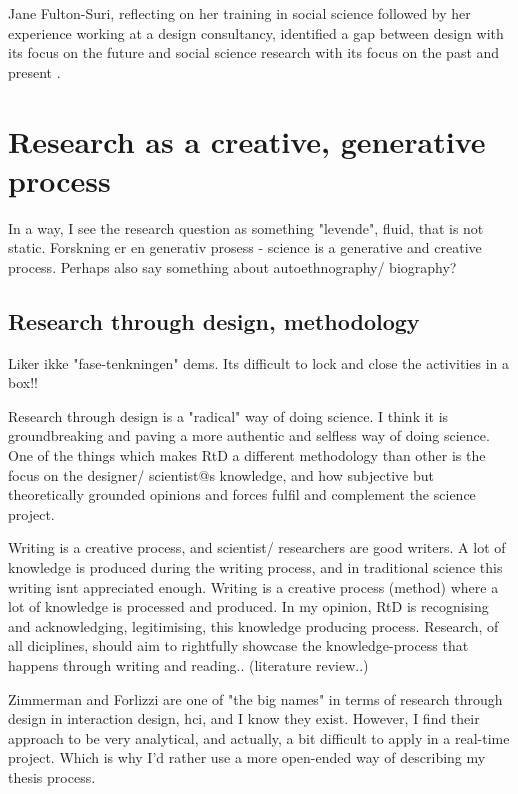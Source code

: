 Jane Fulton-Suri, reflecting on her training in social science followed by her experience working at a design consultancy, identified a gap between design with its focus on the future and social science research with its focus on the past and present \autocite[p. 167]{zimmerman_research_2014}.
\par


\section{Research as a creative, generative process}   
In a way, I see the research question as something "levende", fluid, that is not static. 
Forskning er en generativ prosess - science is a generative and creative process.
Perhaps also say something about autoethnography/ biography?

\subsection{Research through design, methodology}

Liker ikke "fase-tenkningen" dems. Its difficult to lock and close the activities in a box!!

Research through design is a "radical" way of doing science. I think it is groundbreaking and paving a more authentic and selfless way of doing science. One of the things which makes RtD a different methodology than other is the focus on the designer/ scientist@s knowledge, and how subjective but theoretically grounded opinions and forces fulfil and complement the science project. 

Writing is a creative process, and scientist/ researchers are good writers. A lot of knowledge is produced during the writing process, and in traditional science this writing isnt appreciated enough. Writing is a creative process (method) where a lot of knowledge is processed and produced. In my opinion, RtD is recognising and acknowledging, legitimising, this knowledge producing process. Research, of all diciplines, should aim to rightfully showcase the knowledge-process that happens through writing and reading..  (literature review..)

Zimmerman and Forlizzi are one of "the big names" in terms of research through design in interaction design, hci, and I know they exist. However, I find their approach to be very analytical, and actually, a bit difficult to apply in a real-time project. Which is why I'd rather use a more open-ended way of describing my thesis process. 

